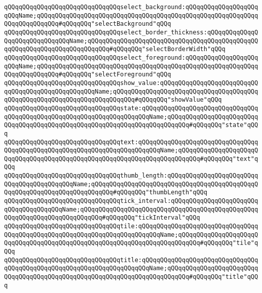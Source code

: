 \verb|qQQqqQQqqQQqqQQqqQQqqQQqqQQqqQQqselect_background:qQQqqQQqqQQqqQQqqQQqqQQqName;qQQqqQQqqQQqqQQqqQQqqQQqqQQqqQQqqQQqqQQqqQQqqQQqqQQqqQQqqQQqqQQqqQQqqQQqqQQq#qQQqqQQq"selectBackground"qQQq|\newline
\newline
\verb|qQQqqQQqqQQqqQQqqQQqqQQqqQQqqQQqselect_border_thickness:qQQqqQQqqQQqqQQqqQQqqQQqqQQqqQQqName;qQQqqQQqqQQqqQQqqQQqqQQqqQQqqQQqqQQqqQQqqQQqqQQqqQQqqQQqqQQqqQQqqQQqqQQqqQQq#qQQqqQQq"selectBorderWidth"qQQq|\newline
\verb|qQQqqQQqqQQqqQQqqQQqqQQqqQQqqQQqselect_foreground:qQQqqQQqqQQqqQQqqQQqqQQqName;qQQqqQQqqQQqqQQqqQQqqQQqqQQqqQQqqQQqqQQqqQQqqQQqqQQqqQQqqQQqqQQqqQQqqQQqqQQq#qQQqqQQq"selectForeground"qQQq|\newline
\verb|qQQqqQQqqQQqqQQqqQQqqQQqqQQqqQQqshow_value:qQQqqQQqqQQqqQQqqQQqqQQqqQQqqQQqqQQqqQQqqQQqqQQqqQQqName;qQQqqQQqqQQqqQQqqQQqqQQqqQQqqQQqqQQqqQQqqQQqqQQqqQQqqQQqqQQqqQQqqQQqqQQqqQQq#qQQqqQQq"showValue"qQQq|\newline
\verb|qQQqqQQqqQQqqQQqqQQqqQQqqQQqqQQqstate:qQQqqQQqqQQqqQQqqQQqqQQqqQQqqQQqqQQqqQQqqQQqqQQqqQQqqQQqqQQqqQQqqQQqqQQqName;qQQqqQQqqQQqqQQqqQQqqQQqqQQqqQQqqQQqqQQqqQQqqQQqqQQqqQQqqQQqqQQqqQQqqQQqqQQq#qQQqqQQq"state"qQQq|\newline
\newline
\verb|qQQqqQQqqQQqqQQqqQQqqQQqqQQqqQQqtext:qQQqqQQqqQQqqQQqqQQqqQQqqQQqqQQqqQQqqQQqqQQqqQQqqQQqqQQqqQQqqQQqqQQqqQQqqQQqName;qQQqqQQqqQQqqQQqqQQqqQQqqQQqqQQqqQQqqQQqqQQqqQQqqQQqqQQqqQQqqQQqqQQqqQQqqQQq#qQQqqQQq"text"qQQq|\newline
\verb|qQQqqQQqqQQqqQQqqQQqqQQqqQQqqQQqthumb_length:qQQqqQQqqQQqqQQqqQQqqQQqqQQqqQQqqQQqqQQqqQQqName;qQQqqQQqqQQqqQQqqQQqqQQqqQQqqQQqqQQqqQQqqQQqqQQqqQQqqQQqqQQqqQQqqQQqqQQqqQQq#qQQqqQQq"thumbLength"qQQq|\newline
\verb|qQQqqQQqqQQqqQQqqQQqqQQqqQQqqQQqtick_interval:qQQqqQQqqQQqqQQqqQQqqQQqqQQqqQQqqQQqqQQqName;qQQqqQQqqQQqqQQqqQQqqQQqqQQqqQQqqQQqqQQqqQQqqQQqqQQqqQQqqQQqqQQqqQQqqQQqqQQq#qQQqqQQq"tickInterval"qQQq|\newline
\newline
\verb|qQQqqQQqqQQqqQQqqQQqqQQqqQQqqQQqtile:qQQqqQQqqQQqqQQqqQQqqQQqqQQqqQQqqQQqqQQqqQQqqQQqqQQqqQQqqQQqqQQqqQQqqQQqqQQqName;qQQqqQQqqQQqqQQqqQQqqQQqqQQqqQQqqQQqqQQqqQQqqQQqqQQqqQQqqQQqqQQqqQQqqQQqqQQq#qQQqqQQq"tile"qQQq|\newline
\verb|qQQqqQQqqQQqqQQqqQQqqQQqqQQqqQQqtitle:qQQqqQQqqQQqqQQqqQQqqQQqqQQqqQQqqQQqqQQqqQQqqQQqqQQqqQQqqQQqqQQqqQQqqQQqName;qQQqqQQqqQQqqQQqqQQqqQQqqQQqqQQqqQQqqQQqqQQqqQQqqQQqqQQqqQQqqQQqqQQqqQQqqQQq#qQQqqQQq"title"qQQq|\newline
